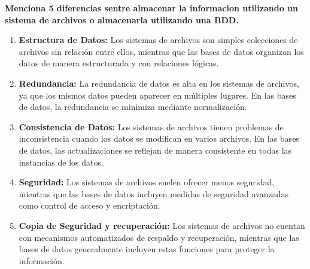 \begin{center}
    \textbf{Menciona 5 diferencias sentre almacenar la informacion utilizando un sistema de archivos o almacenarla utilizando una BDD.}
    \begin{enumerate}
    \item \textbf{Estructura de Datos:} Los sistemas de archivos son simples colecciones de archivos sin relación entre ellos, mientras que             las bases de datos organizan los datos de manera estructurada y con relaciones lógicas.
    \item \textbf{Redundancia:} La redundancia de datos es alta en los sistemas de archivos, ya que los mismos datos pueden aparecer en                 múltiples lugares. En las bases de datos, la redundancia se minimiza mediante normalización.
    \item \textbf{Consistencia de Datos:} Los sistemas de archivos tienen problemas de inconsistencia cuando los datos se modifican en                 varios archivos. En las bases de datos, las actualizaciones se reflejan de manera consistente en todas las instancias de los datos.
    \item \textbf{Seguridad:} Los sistemas de archivos suelen ofrecer menos seguridad, mientras que las bases de datos incluyen medidas de             seguridad avanzadas como control de acceso y encriptación. 
    \item \textbf{Copia de Seguridad y recuperación:} Los sistemas de archivos no cuentan con mecanismos automatizados de respaldo y                     recuperación, mientras que las bases de datos generalmente incluyen estas funciones para proteger la información.\\
    \cite{guru99, sooluciona}
\end{enumerate}
\end{center}
